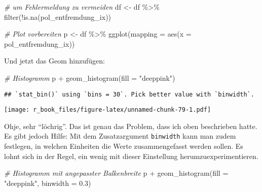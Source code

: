 \documentclass[
]{book}
\newenvironment{Shaded}{\begin{snugshade}}{\end{snugshade}}
\newcommand{\AttributeTok}[1]{\textcolor[rgb]{0.77,0.63,0.00}{#1}}
\newcommand{\CommentTok}[1]{\textcolor[rgb]{0.56,0.35,0.01}{\textit{#1}}}
\newcommand{\FloatTok}[1]{\textcolor[rgb]{0.00,0.00,0.81}{#1}}
\newcommand{\FunctionTok}[1]{\textcolor[rgb]{0.00,0.00,0.00}{#1}}
\newcommand{\NormalTok}[1]{#1}
\newcommand{\OtherTok}[1]{\textcolor[rgb]{0.56,0.35,0.01}{#1}}
\newcommand{\SpecialCharTok}[1]{\textcolor[rgb]{0.00,0.00,0.00}{#1}}
\newcommand{\StringTok}[1]{\textcolor[rgb]{0.31,0.60,0.02}{#1}}
\begin{document}
\begin{Shaded}
\begin{Highlighting}[]
\CommentTok{\# um Fehlermeldung zu vermeiden}
\NormalTok{df }\OtherTok{\textless{}{-}}\NormalTok{ df }\SpecialCharTok{\%\textgreater{}\%} 
  \FunctionTok{filter}\NormalTok{(}\SpecialCharTok{!}\FunctionTok{is.na}\NormalTok{(pol\_entfremdung\_ix))}
\end{Highlighting}
\end{Shaded}

\begin{Shaded}
\begin{Highlighting}[]
\CommentTok{\# Plot vorbereiten}
\NormalTok{p }\OtherTok{\textless{}{-}}\NormalTok{ df }\SpecialCharTok{\%\textgreater{}\%} 
  \FunctionTok{ggplot}\NormalTok{(}\AttributeTok{mapping =} \FunctionTok{aes}\NormalTok{(}\AttributeTok{x =}\NormalTok{ pol\_entfremdung\_ix))}
\end{Highlighting}
\end{Shaded}

Und jetzt das Geom hinzufügen:

\begin{Shaded}
\begin{Highlighting}[]
\CommentTok{\# Histogramm}
\NormalTok{p }\SpecialCharTok{+} \FunctionTok{geom\_histogram}\NormalTok{(}\AttributeTok{fill =} \StringTok{"deeppink"}\NormalTok{) }
\end{Highlighting}
\end{Shaded}

\begin{verbatim}
## `stat_bin()` using `bins = 30`. Pick better value with `binwidth`.
\end{verbatim}

\texttt{[image: r\_book\_files/figure-latex/unnamed-chunk-79-1.pdf]}

Ohje, sehr ``löchrig''. Das ist genau das Problem, dass ich oben beschrieben hatte. Es gibt jedoch Hilfe: Mit dem Zusatzargument \texttt{binwidth} kann man zudem festlegen, in welchen Einheiten die Werte zusammengefasst werden sollen. Es lohnt sich in der Regel, ein wenig mit dieser Einstellung herumzuexperimentieren.

\begin{Shaded}
\begin{Highlighting}[]
\CommentTok{\# Histogramm mit angepasster Balkenbreite}
\NormalTok{p }\SpecialCharTok{+} \FunctionTok{geom\_histogram}\NormalTok{(}\AttributeTok{fill =} \StringTok{"deeppink"}\NormalTok{, }\AttributeTok{binwidth =} \FloatTok{0.3}\NormalTok{) }
\end{Highlighting}
\end{Shaded}
\end{document}
